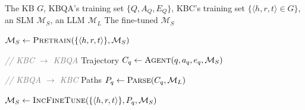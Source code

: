 

\begin{center}  %
\begin{minipage}{0.96\columnwidth}  %
\begin{algorithm}[H] %
\small %
    \caption{JCQL}
    \label{alg:joint training framework}
    \renewcommand{\algorithmicrequire}{\textbf{Input:}}
    \renewcommand{\algorithmicensure}{\textbf{Output:}}
    
    \begin{algorithmic}[1] %
        \REQUIRE The KB $G$, KBQA's training set $\{Q,A_Q,E_Q\}$, KBC's training set $\{\langle h,r,t\rangle\!\in\!G\}$, an SLM $\mathcal{M}_S$, an LLM $\mathcal{M}_L$
        \ENSURE The fine-tuned $\mathcal{M}_S$
        
        \STATE $\mathcal{M}_S \leftarrow \textsc{Pretrain}(\{\langle h,r,t\rangle\},\mathcal{M}_S)$
        
            \STATE \textcolor{gray}{\textit{// KBC $\to$ KBQA}}
            \STATE Trajectory $C_q \leftarrow \textsc{Agent}(q,a_q,e_q,\mathcal{M}_S)$

            \STATE \textcolor{gray}{\textit{// KBQA $\to$ KBC}}
            \STATE Paths $P_q \leftarrow \textsc{Parse}(C_q,\mathcal{M}_L)$
            
            \STATE $\mathcal{M}_S \leftarrow \textsc{IncFineTune}(\{\langle h,r,t\rangle\},P_q,\mathcal{M}_S)$
        \ENDFOR
    \end{algorithmic}
\end{algorithm}
\end{minipage}
\end{center}